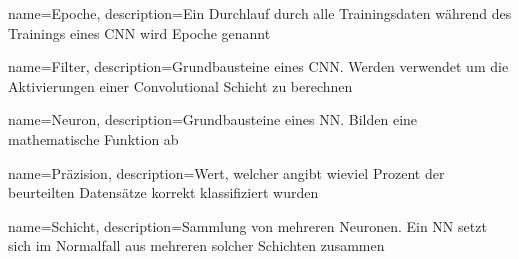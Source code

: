 
{
  name={Epoche},
  description={Ein Durchlauf durch alle Trainingsdaten während des Trainings eines CNN wird Epoche genannt}
}

{
  name={Filter},
  description={Grundbausteine eines CNN. Werden verwendet um die Aktivierungen einer Convolutional Schicht zu berechnen}
}

{
  name={Neuron},
  description={Grundbausteine eines NN. Bilden eine mathematische Funktion ab}
}

{
  name={Präzision},
  description={Wert, welcher angibt wieviel Prozent der beurteilten Datensätze korrekt klassifiziert wurden}
}

{
  name={Schicht},
  description={Sammlung von mehreren Neuronen. Ein NN setzt sich im Normalfall aus mehreren solcher Schichten zusammen}
}


